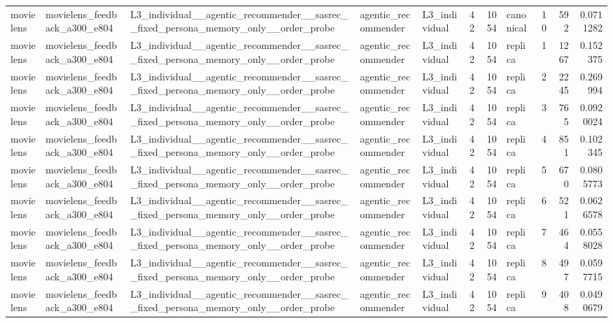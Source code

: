 \begin{table}[htbp!]
\begin{tabular}{lllllrrlrrr}
movielens & movielens\_feedback\_a300\_e804 & L3\_individual\_\_agentic\_recommender\_\_sasrec\_\_fixed\_persona\_memory\_only\_\_order\_probe & agentic\_recommender & L3\_individual & 42 & 1054 & canonical & 10 & 592 & 0.0711282 \\
movielens & movielens\_feedback\_a300\_e804 & L3\_individual\_\_agentic\_recommender\_\_sasrec\_\_fixed\_persona\_memory\_only\_\_order\_probe & agentic\_recommender & L3\_individual & 42 & 1054 & replica & 1 & 1267 & 0.152375 \\
movielens & movielens\_feedback\_a300\_e804 & L3\_individual\_\_agentic\_recommender\_\_sasrec\_\_fixed\_persona\_memory\_only\_\_order\_probe & agentic\_recommender & L3\_individual & 42 & 1054 & replica & 2 & 2245 & 0.269994 \\
movielens & movielens\_feedback\_a300\_e804 & L3\_individual\_\_agentic\_recommender\_\_sasrec\_\_fixed\_persona\_memory\_only\_\_order\_probe & agentic\_recommender & L3\_individual & 42 & 1054 & replica & 3 & 765 & 0.0920024 \\
movielens & movielens\_feedback\_a300\_e804 & L3\_individual\_\_agentic\_recommender\_\_sasrec\_\_fixed\_persona\_memory\_only\_\_order\_probe & agentic\_recommender & L3\_individual & 42 & 1054 & replica & 4 & 851 & 0.102345 \\
movielens & movielens\_feedback\_a300\_e804 & L3\_individual\_\_agentic\_recommender\_\_sasrec\_\_fixed\_persona\_memory\_only\_\_order\_probe & agentic\_recommender & L3\_individual & 42 & 1054 & replica & 5 & 670 & 0.0805773 \\
movielens & movielens\_feedback\_a300\_e804 & L3\_individual\_\_agentic\_recommender\_\_sasrec\_\_fixed\_persona\_memory\_only\_\_order\_probe & agentic\_recommender & L3\_individual & 42 & 1054 & replica & 6 & 521 & 0.0626578 \\
movielens & movielens\_feedback\_a300\_e804 & L3\_individual\_\_agentic\_recommender\_\_sasrec\_\_fixed\_persona\_memory\_only\_\_order\_probe & agentic\_recommender & L3\_individual & 42 & 1054 & replica & 7 & 464 & 0.0558028 \\
movielens & movielens\_feedback\_a300\_e804 & L3\_individual\_\_agentic\_recommender\_\_sasrec\_\_fixed\_persona\_memory\_only\_\_order\_probe & agentic\_recommender & L3\_individual & 42 & 1054 & replica & 8 & 497 & 0.0597715 \\
movielens & movielens\_feedback\_a300\_e804 & L3\_individual\_\_agentic\_recommender\_\_sasrec\_\_fixed\_persona\_memory\_only\_\_order\_probe & agentic\_recommender & L3\_individual & 42 & 1054 & replica & 9 & 408 & 0.0490679 \\

\end{tabular}
\end{table}
